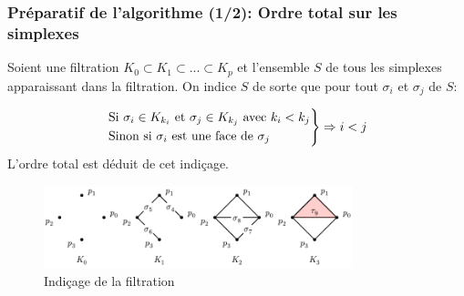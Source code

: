 \documentclass{beamer}
\begin{document}
\begin{frame}
    \frametitle{Préparatif de l'algorithme (1/2): Ordre total sur les simplexes}
    Soient une filtration $K_0 \subset K_1 \subset ... \subset K_p$ et l'ensemble $S$ de tous les simplexes apparaissant dans la filtration. On indice $S$ de sorte que pour tout $\sigma_i$ et $\sigma_j$ de $S$: 

    $$ 
    \begin{rcases}
        \text{Si } \sigma_i \in K_{k_i} \text{ et } \sigma_j \in K_{k_j} \text{ avec } k_i < k_j\\
        \text{Sinon si } \sigma_i \text{ est une face de } \sigma_j
    \end{rcases}\Rightarrow i < j 
    $$
    L'ordre total est déduit de cet indiçage.
    \begin{figure}
        \includegraphics[width=0.8\textwidth]{../images/filtration_horizontal.png}
        \caption{Indiçage de la filtration}
    \end{figure}
\end{frame}
\end{document}
